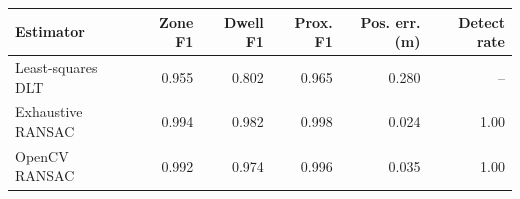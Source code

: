 \begin{tabular}{lrrrrr}
\toprule
Estimator & Zone F1 & Dwell F1 & Prox. F1 & Pos. err. (m) & Detect rate \\
\midrule
Least-squares DLT & 0.955 & 0.802 & 0.965 & 0.280 & -- \\
Exhaustive RANSAC & 0.994 & 0.982 & 0.998 & 0.024 & 1.00 \\
OpenCV RANSAC & 0.992 & 0.974 & 0.996 & 0.035 & 1.00 \\
\bottomrule
\end{tabular}
